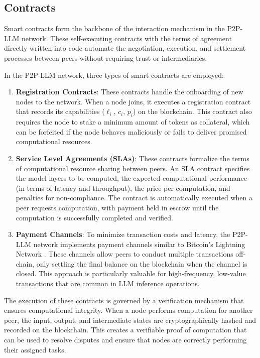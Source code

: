 \documentclass[preprint,twoside,11pt]{article}
\begin{document}
\subsection{Contracts}

Smart contracts form the backbone of the interaction mechanism in the P2P-LLM network. These self-executing contracts with the terms of agreement directly written into code automate the negotiation, execution, and settlement processes between peers without requiring trust or intermediaries.

In the P2P-LLM network, three types of smart contracts are employed:

\begin{enumerate}
	\item \textbf{Registration Contracts}: These contracts handle the onboarding of new nodes to the network. When a node joins, it executes a registration contract that records its capabilities ($\ell_i$, $c_i$, $p_i$) on the blockchain. This contract also requires the node to stake a minimum amount of tokens as collateral, which can be forfeited if the node behaves maliciously or fails to deliver promised computational resources.
	\item \textbf{Service Level Agreements (SLAs)}: These contracts formalize the terms of computational resource sharing between peers. An SLA contract specifies the model layers to be computed, the expected computational performance (in terms of latency and throughput), the price per computation, and penalties for non-compliance. The contract is automatically executed when a peer requests computation, with payment held in escrow until the computation is successfully completed and verified.
	\item \textbf{Payment Channels}: To minimize transaction costs and latency, the P2P-LLM network implements payment channels similar to Bitcoin's Lightning Network \citep{poon2016bitcoin}. These channels allow peers to conduct multiple transactions off-chain, only settling the final balance on the blockchain when the channel is closed. This approach is particularly valuable for high-frequency, low-value transactions that are common in LLM inference operations.
\end{enumerate}

The execution of these contracts is governed by a verification mechanism that ensures computational integrity. When a node performs computation for another peer, the input, output, and intermediate states are cryptographically hashed and recorded on the blockchain. This creates a verifiable proof of computation that can be used to resolve disputes and ensure that nodes are correctly performing their assigned tasks.
\end{document}
